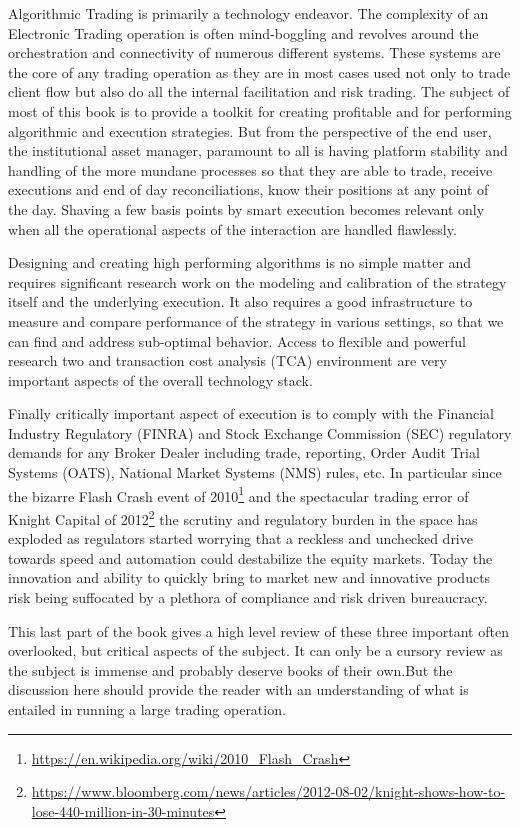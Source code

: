 
Algorithmic Trading is primarily a technology endeavor. The complexity of an Electronic Trading operation is often mind-boggling and revolves around the orchestration and connectivity of numerous different systems. These systems are the core of any trading operation as they are in most cases used not only to trade client flow but also do all the internal facilitation and risk trading. The subject of most of this book is to provide a toolkit for creating profitable and for performing algorithmic and execution strategies. But from the perspective of the end user, the institutional asset manager, paramount to all is having platform stability and handling of the more mundane processes so that they are able to trade, receive executions and end of day reconciliations, know their positions at any point of the day. Shaving a few basis points by smart execution becomes relevant only when all the operational aspects of the interaction are handled flawlessly.


Designing and creating high performing algorithms is no simple matter and requires significant research work on the modeling and calibration of the strategy itself and the underlying execution. It also requires a good infrastructure to measure and compare  performance of the strategy in various settings, so that we can find and address sub-optimal behavior. Access to flexible and powerful research two and transaction cost analysis (TCA) environment are very important aspects of the overall technology stack.


Finally critically important aspect of execution is to comply with the Financial Industry Regulatory (FINRA) and Stock Exchange Commission (SEC) regulatory demands for any Broker Dealer including trade, reporting, Order Audit Trial Systems (OATS), National Market Systems (NMS) rules, etc. In particular since the bizarre Flash Crash event of 2010\footnote{\url{https://en.wikipedia.org/wiki/2010_Flash_Crash}} and the spectacular trading error of Knight Capital of 2012\footnote{\url{https://www.bloomberg.com/news/articles/2012-08-02/knight-shows-how-to-lose-440-million-in-30-minutes}} the scrutiny and regulatory burden in the space has exploded as regulators started worrying that a reckless and unchecked drive towards speed and automation could destabilize the equity markets. Today the innovation and ability to quickly bring to market new and innovative products risk being suffocated by a plethora of compliance and risk driven bureaucracy. 


This last part of the book gives a high level review of these three important often overlooked, but critical aspects of the subject. It can only be a cursory review as the subject is immense and probably deserve books of their own.But the discussion here should provide the reader with an understanding of what is entailed in running a large trading operation.

 

